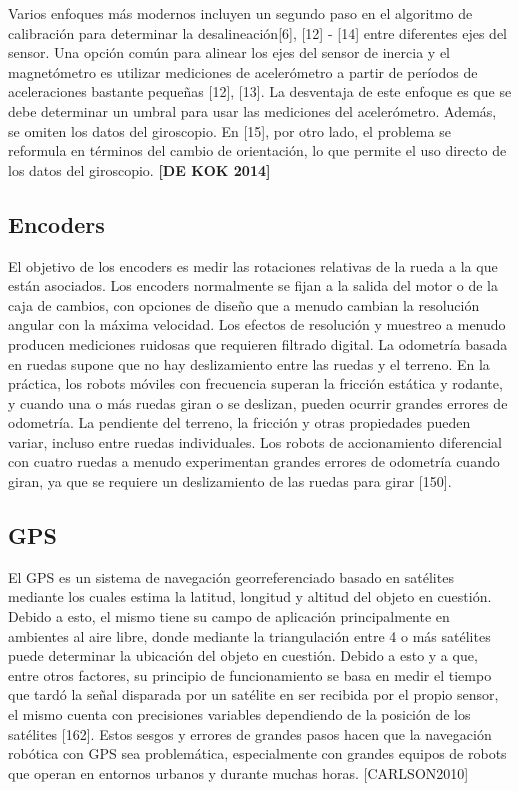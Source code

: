 Varios enfoques más modernos incluyen un segundo paso en el algoritmo de calibración para determinar la desalineación[6], [12] - [14] entre diferentes ejes del sensor. Una opción común para alinear los ejes del sensor de inercia y el magnetómetro es utilizar mediciones de acelerómetro a partir de períodos de aceleraciones bastante pequeñas [12], [13]. La desventaja de este enfoque es que se debe determinar un umbral para usar las mediciones del acelerómetro. Además, se omiten los datos del giroscopio. En [15], por otro lado, el problema se reformula en términos del cambio de orientación, lo que permite el uso directo de los datos del giroscopio. \textbf{[DE KOK 2014]}


\subsection{Encoders}
El objetivo de los encoders es medir las rotaciones relativas de la rueda a la que están asociados. Los encoders normalmente se fijan a la salida del motor o de la caja de cambios, con opciones de diseño que a menudo cambian la resolución angular con la máxima velocidad. Los efectos de resolución y muestreo a menudo producen mediciones ruidosas que requieren filtrado digital. La odometría basada en ruedas supone que no hay deslizamiento entre las ruedas y el terreno. En la práctica, los robots móviles con frecuencia superan la fricción estática y rodante, y cuando una o más ruedas giran o se deslizan, pueden ocurrir grandes errores de odometría. La pendiente del terreno, la fricción y otras propiedades pueden variar, incluso entre ruedas individuales. Los robots de accionamiento diferencial con cuatro ruedas a menudo experimentan grandes errores de odometría cuando giran, ya que se requiere un deslizamiento de las ruedas para girar [150].

\subsection{GPS}
El GPS es un sistema de navegación georreferenciado basado en satélites mediante los cuales estima la latitud, longitud y altitud del objeto en cuestión. Debido a esto, el mismo tiene su campo de aplicación principalmente en ambientes al aire libre, donde mediante la triangulación entre 4 o más satélites puede determinar la ubicación del objeto en cuestión. Debido a esto y a que, entre otros factores, su principio de funcionamiento se basa en medir el tiempo que tardó la señal disparada por un satélite en ser recibida por el propio sensor, el mismo cuenta con precisiones variables dependiendo de la posición de los satélites [162]. Estos sesgos y errores de grandes pasos hacen que la navegación robótica con GPS sea problemática, especialmente con grandes equipos de robots que operan en entornos urbanos y durante muchas horas. [CARLSON2010]